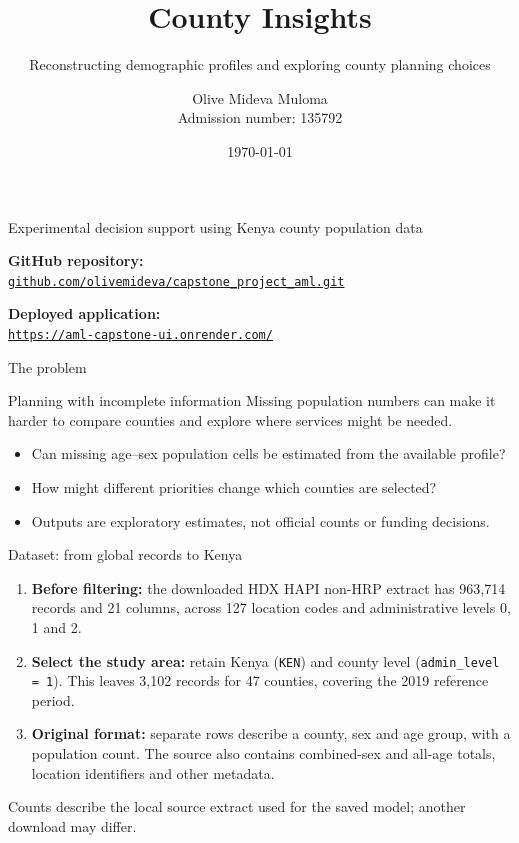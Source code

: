 \documentclass[aspectratio=169,11pt]{beamer}
\title[County Insights]{County Insights}
\subtitle{Reconstructing demographic profiles and exploring county planning choices}
\author[Olive Mideva Muloma]{Olive Mideva Muloma\\Admission number: 135792}
\date{\today}
\newcommand{\deploymentlink}{%
  \href{https://aml-capstone-ui.onrender.com/}{%
    \textcolor{RoyalPurple}{\nolinkurl{https://aml-capstone-ui.onrender.com/}}}}
\begin{document}
\begin{frame}
  \titlepage
  \vspace{-0.5em}
  \centering\small Experimental decision support using Kenya county population data
  \par\vspace{0.6em}
  \textbf{GitHub repository:}\\
  \href{https://github.com/olivemideva/capstone_project_aml.git}{%
    \textcolor{RoyalPurple}{\nolinkurl{github.com/olivemideva/capstone_project_aml.git}}}
  \par\vspace{0.3em}
  \textbf{Deployed application:}\\
  \deploymentlink
\end{frame}

\begin{frame}{The problem}
  \begin{block}{Planning with incomplete information}
    Missing population numbers can make it harder to compare counties and explore
    where services might be needed.
  \end{block}
  \begin{itemize}
    \item Can missing age--sex population cells be estimated from the available profile?
    \item How might different priorities change which counties are selected?
    \item Outputs are exploratory estimates, not official counts or funding decisions.
  \end{itemize}
\end{frame}

\begin{frame}{Dataset: from global records to Kenya}
  \begin{enumerate}
    \item \textbf{Before filtering:} the downloaded HDX HAPI non-HRP extract has
    963,714 records and 21 columns, across 127 location codes and administrative
    levels 0, 1 and 2.
    \item \textbf{Select the study area:} retain Kenya (\texttt{KEN}) and county
    level (\texttt{admin\_level = 1}). This leaves 3,102 records for 47 counties,
    covering the 2019 reference period.
    \item \textbf{Original format:} separate rows describe a county, sex and age
    group, with a population count. The source also contains combined-sex and
    all-age totals, location identifiers and other metadata.
  \end{enumerate}
  \small Counts describe the local source extract used for the saved model;
  another download may differ.
\end{frame}
\end{document}
